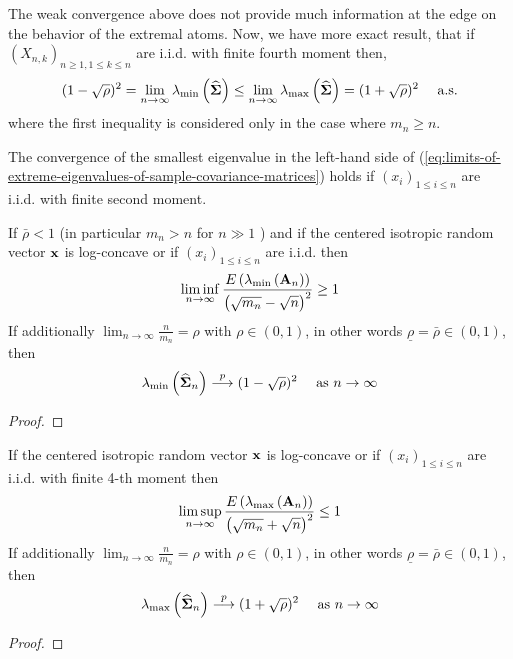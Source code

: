 The weak convergence above does not provide much information at the edge on the behavior of the extremal atoms. Now, we have more exact result, that if $\left(X_{n,k}\right)_{n\geq 1,1\leq k\leq n}$ are i.i.d. with finite fourth moment then,
\begin{equation} \label{eq:limits-of-extreme-eigenvalues-of-sample-covariance-matrices}
	(1-\sqrt{\rho})^{2}=\lim_{n\rightarrow\infty}\lambda_{\min}\left(\widehat{\boldsymbol{\Sigma}}\right)\leq\lim_{n\rightarrow\infty}\lambda_{\max}\left(\widehat{\boldsymbol{\Sigma}}\right)=(1+\sqrt{\rho})^{2}\quad\text{ a.s.}
\end{equation}
where the first inequality is considered only in the case where $m_{n}\geq n$.

\begin{remark}
	The convergence of the smallest eigenvalue in the left-hand side of (\ref{eq:limits-of-extreme-eigenvalues-of-sample-covariance-matrices}) holds if $\left(x_{i}\right)_{1\leq i\leq n}$ are i.i.d. with finite second moment.
\end{remark}

\begin{theorem}
	If $\bar{\rho}<1$ (in particular $m_{n}>n$ for $n\gg 1$ ) and if the centered isotropic random vector ${\bf x}$ is log-concave or if $\left(x_{i}\right)_{1\leq i\leq n}$ are i.i.d. then
	\begin{equation}
		\liminf_{n\rightarrow\infty}\frac{E\left(\lambda_{\min}\left({\bf A}_{n}\right)\right)}{\left(\sqrt{m_{n}}-\sqrt{n}\right)^{2}}\geq 1
	\end{equation}
	If additionally $\lim_{n\rightarrow\infty}\frac{n}{m_{n}}=\rho$ with $\rho \in(0,1)$, in other words $\underline{\rho}=\bar{\rho}\in(0,1)$, then
	\begin{equation}
		\lambda_{\min}\left(\widehat{\boldsymbol{\Sigma}}_{n}\right)\stackrel{p}{\longrightarrow}(1-\sqrt{\rho})^{2}\quad\text{ as }n\rightarrow\infty
	\end{equation}
\end{theorem}

\begin{proof}

\end{proof}

\begin{theorem}
	If the centered isotropic random vector ${\bf x}$ is log-concave or if $\left(x_{i}\right)_{1\leq i\leq n}$ are i.i.d. with finite 4-th moment then
	\begin{equation}
		\limsup_{n\rightarrow\infty}\frac{E\left(\lambda_{\max}\left({\bf A}_{n}\right)\right)}{\left(\sqrt{m_{n}}+\sqrt{n}\right)^{2}}\leq 1
	\end{equation}
	If additionally $\lim_{n\rightarrow\infty}\frac{n}{m_{n}}=\rho$ with $\rho \in(0,1)$, in other words $\underline{\rho}=\bar{\rho}\in(0,1)$, then
	\begin{equation}
		\lambda_{\max}\left(\widehat{\boldsymbol{\Sigma}}_{n}\right)\stackrel{p}{\longrightarrow}(1+\sqrt{\rho})^{2}\quad\text{ as }n\rightarrow\infty
	\end{equation}
\end{theorem}

\begin{proof}

\end{proof}
